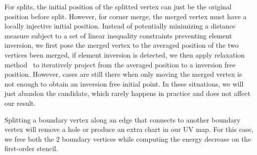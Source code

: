 For splits, the initial position of the splitted vertex can just be the original position before split. However, for corner merge, the merged vertex must have a locally injective initial position. Instead of potentially minimizing a distance measure subject to a set of linear inequality constraints preventing element inversion, we first pose the merged vertex to the averaged position of the two vertices been merged, if element inversion is detected, we then apply relaxation method~\cite{Agmon1954Relaxation} to iteratively project from the averaged position to a inversion free position. However, cases are still there when only moving the merged vertex is not enough to obtain an inversion free initial point. In these situations, we will just abandon the candidate, which rarely happens in practice and does not affect our result.

Splitting a boundary vertex along an edge that connects to another boundary vertex will remove a hole or produce an extra chart in our UV map. For this case, we free both the 2 boundary vertices while computing the energy decrease on the first-order stencil. 